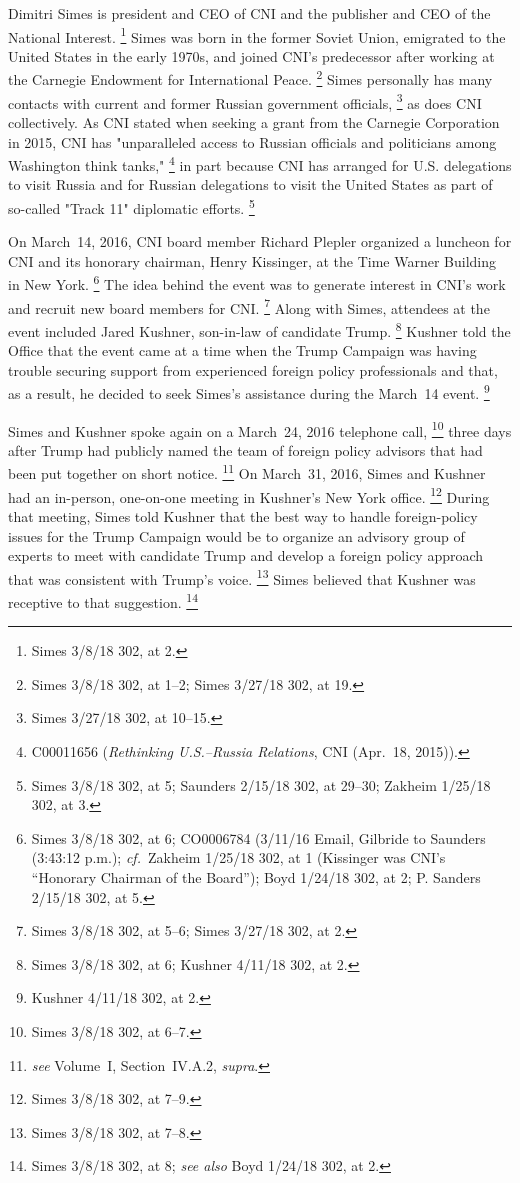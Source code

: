 Dimitri Simes is president and CEO of CNI and the publisher and CEO of the National Interest.%
\footnote{Simes 3/8/18 302, at 2.}
Simes was born in the former Soviet Union, emigrated to the United States in the early 1970s, and joined CNI's predecessor after working at the Carnegie Endowment for International Peace.%
\footnote{ Simes 3/8/18 302, at 1--2;
Simes 3/27/18 302, at 19.}
Simes personally has many contacts with current and former Russian government officials,%
\footnote{Simes 3/27/18 302, at 10--15.}
as does CNI collectively.
As CNI stated when seeking a grant from the Carnegie Corporation in 2015, CNI has "unparalleled access to Russian officials and politicians among Washington think tanks,"%
\footnote{C00011656 (\textit{Rethinking U.S.--Russia Relations}, CNI (Apr.~18, 2015)).}
in part because CNI has arranged for U.S. delegations to visit Russia and for Russian delegations to visit the United States as part of so-called "Track 11" diplomatic efforts.%
\footnote{Simes 3/8/18 302, at 5;
Saunders 2/15/18 302, at 29--30;
Zakheim 1/25/18 302, at 3.}

On March~14, 2016, CNI board member Richard Plepler organized a luncheon for CNI and its honorary chairman, Henry Kissinger, at the Time Warner Building in New York.%
\footnote{Simes 3/8/18 302, at 6;
CO0006784 (3/11/16 Email, Gilbride to Saunders (3:43:12 p.m.);
\textit{cf.}~Zakheim 1/25/18 302, at 1 (Kissinger was CNI's “Honorary Chairman of the Board”);
Boyd 1/24/18 302, at 2;
P. Sanders 2/15/18 302, at 5.}
The idea behind the event was to generate interest in CNI's work and recruit new board members for CNI\null.%
\footnote{Simes 3/8/18 302, at 5--6; Simes 3/27/18 302, at 2.}
Along with Simes, attendees at the event included Jared Kushner, son-in-law of candidate Trump.%
\footnote{Simes 3/8/18 302, at 6; Kushner 4/11/18 302, at 2.}
Kushner told the Office that the event came at a time when the Trump Campaign was having trouble securing support from experienced foreign policy professionals and that, as a result, he decided to seek Simes's assistance during the March~14 event.%
\footnote{Kushner 4/11/18 302, at 2.}

Simes and Kushner spoke again on a March~24, 2016 telephone call,%
\footnote{Simes 3/8/18 302, at 6--7.}
three days after Trump had publicly named the team of foreign policy advisors that had been put together on short notice.%
\footnote{ \textit{see} Volume~I, Section~IV.A.2, \textit{supra}.}
On March~31, 2016, Simes and Kushner had an in-person, one-on-one meeting in Kushner's New York office.%
\footnote{Simes 3/8/18 302, at 7--9.}
During that meeting, Simes told Kushner that the best way to handle foreign-policy issues for the Trump Campaign would be to organize an advisory group of experts to meet with candidate Trump and develop a foreign policy approach that was consistent with Trump's voice.%
\footnote{Simes 3/8/18 302, at 7--8.}
Simes believed that Kushner was receptive to that suggestion.%
\footnote{Simes 3/8/18 302, at 8;
\textit{see also} Boyd 1/24/18 302, at 2.}

